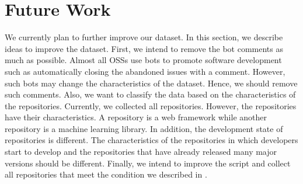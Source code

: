\section{Future Work}
\label{sec:future}

We currently plan to further improve our dataset. 
In this section, we describe ideas to improve the dataset. 
First, we intend to remove the bot comments as much as 
possible. 
Almost all OSSs use bots to promote software development 
such as automatically closing the abandoned issues with 
a comment. 
However, such bots may change the characteristics of 
the dataset. 
Hence, we should remove such comments. 
Also, we want to classify the data based on 
the characteristics of the repositories. 
Currently, we collected all repositories. 
However, the repositories have their characteristics. 
A repository is a web framework while another repository is 
a machine learning library. 
In addition, the development state of repositories is different. 
The characteristics of the repositories in which 
developers start to develop and the repositories that 
have already released many major versions should be different. 
Finally, we intend to improve the script and 
collect all repositories that meet the condition we described in . 
